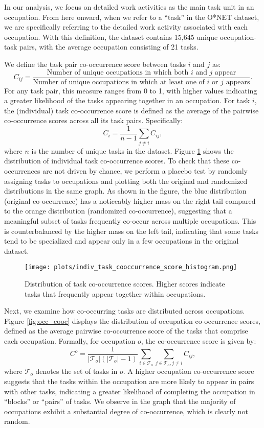 \documentclass{article}
\theoremstyle{plain}
\theoremstyle{plain}
\begin{document}
In our analysis, we focus on detailed work activities as the main task unit in an occupation. 
From here onward, when we refer to a “task” in the O*NET dataset, we are specifically referring to the detailed work activity associated with each occupation. 
With this definition, the dataset contains 15,645 unique occupation-task pairs, with the average occupation consisting of 21 tasks.

We define the task pair co-occurrence score between tasks $i$ and $j$  as:
$$C_{ij} = \frac{\text{Number of unique occupations in which both $i$ and $j$ appear}}{\text{Number of unique occupations in which at least one of $i$ or $j$ appears}}.$$
For any task pair, this measure ranges from 0 to 1, with higher values indicating a greater likelihood of the tasks appearing together in an occupation.
For task $i$, the (individual) task co-occurrence score is defined as the average of the pairwise co-occurrence scores across all its task pairs. Specifically:
$$C_{i}=\frac{1}{n-1}\sum_{j\neq i}C_{ij},$$ 
where $n$ is the number of unique tasks in the dataset.
Figure \ref{fig:task_cooc} shows the distribution of individual task co-occurrence scores. 
To check that these co-occurrences are not driven by chance, we perform a placebo test by randomly assigning tasks to occupations and plotting both the original and randomized distributions in the same graph. 
As shown in the figure, the blue distribution (original co-occurrence) has a noticeably higher mass on the right tail compared to the orange distribution (randomized co-occurrence), suggesting that a meaningful subset of tasks frequently co-occur across multiple occupations. 
This is counterbalanced by the higher mass on the left tail, indicating that some tasks tend to be specialized and appear only in a few occupations in the original dataset.

\begin{figure}[htbp]
  \centering
  \texttt{[image: plots/indiv\_task\_cooccurrence\_score\_histogram.png]}
  \caption{Distribution of task co-occurrence scores. Higher scores indicate tasks that frequently appear together within occupations.}
  \label{fig:task_cooc}
\end{figure}

Next, we examine how co-occurring tasks are distributed across occupations. 
Figure \ref{fig:occ_cooc} displays the distribution of occupation co-occurrence scores, defined as the average pairwise co-occurrence score of the tasks that comprise each occupation.
Formally, for occupation $o$, the co-occurrence score is given by:
$$C^o=\frac{1}{|\mathcal{T}_o| ( |\mathcal{T}_o|-1)} \sum_{i\in\mathcal{T}_o} \sum_{j\in\mathcal{T}_o,j\neq i} C_{ij},$$
where $\mathcal{T}_o$ denotes the set of tasks in $o$. 
A higher occupation co-occurrence score suggests that the tasks within the occupation are more likely to appear in pairs with other tasks, indicating a greater likelihood of completing the occupation in “blocks” or “pairs” of tasks. 
We observe in the graph that the majority of occupations exhibit a substantial degree of co-occurrence, which is clearly not random.
\end{document}
